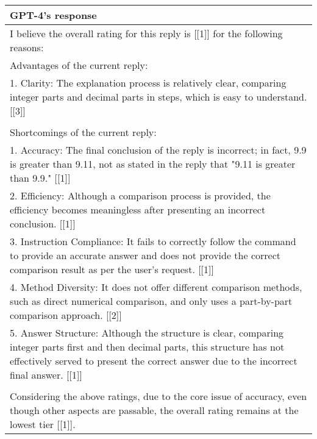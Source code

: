 \begin{table*}[tbh!]
  \caption{Evaluation result from GPT-4 to the prompt in Table~\ref{tab: math example}.}
  \label{tab: gpt-4's response}
  \small
  \begin{tabularx}{\textwidth}{X}
    \toprule
        GPT-4's response \\ \midrule

        I believe the overall rating for this reply is [[1]] for the following reasons:\\
        Advantages of the current reply:\\
        1. Clarity: The explanation process is relatively clear, comparing integer parts and decimal parts in steps, which is easy to understand. [[3]]\\
        \\
        Shortcomings of the current reply:\\
        1. Accuracy: The final conclusion of the reply is incorrect; in fact, 9.9 is greater than 9.11, not as stated in the reply that "9.11 is greater than 9.9." [[1]]\\
        2. Efficiency: Although a comparison process is provided, the efficiency becomes meaningless after presenting an incorrect conclusion. [[1]]\\
        3. Instruction Compliance: It fails to correctly follow the command to provide an accurate answer and does not provide the correct comparison result as per the user’s request. [[1]]\\
        4. Method Diversity: It does not offer different comparison methods, such as direct numerical comparison, and only uses a part-by-part comparison approach. [[2]]\\
        5. Answer Structure: Although the structure is clear, comparing integer parts first and then decimal parts, this structure has not effectively served to present the correct answer due to the incorrect final answer. [[1]]\\
        \\
        Considering the above ratings, due to the core issue of accuracy, even though other aspects are passable, the overall rating remains at the lowest tier [[1]].\\
    \bottomrule
  \end{tabularx}
\end{table*}


